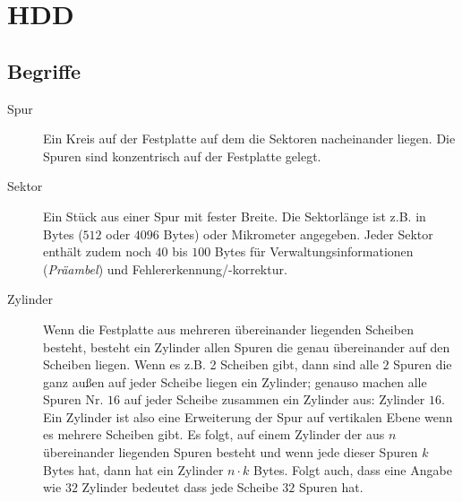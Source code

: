 \section{HDD}

\subsection{Begriffe}
\begin{description}
\item[Spur]
Ein Kreis auf der Festplatte auf dem die Sektoren nacheinander liegen. Die
Spuren sind konzentrisch auf der Festplatte gelegt.

\item[Sektor]
Ein Stück aus einer Spur mit fester Breite. Die Sektorlänge ist z.B. in Bytes
($512$ oder $4096$ Bytes) oder Mikrometer angegeben. Jeder Sektor enthält zudem
noch $40$ bis $100$ Bytes für Verwaltungsinformationen (\emph{Präambel}) und 
Fehlererkennung/-korrektur.

\item[Zylinder]
Wenn die Festplatte aus mehreren übereinander liegenden Scheiben besteht,
besteht ein Zylinder allen Spuren die genau übereinander auf den Scheiben
liegen. Wenn es z.B. 2 Scheiben gibt, dann sind alle $2$ Spuren die ganz außen
auf jeder Scheibe liegen ein Zylinder; genauso machen alle Spuren Nr. $16$ auf
jeder Scheibe zusammen ein Zylinder aus: Zylinder $16$. Ein Zylinder ist also
eine Erweiterung der Spur auf vertikalen Ebene wenn es mehrere Scheiben gibt. Es
folgt, auf einem Zylinder der aus $n$ übereinander liegenden Spuren besteht und
wenn jede dieser Spuren $k$ Bytes hat, dann hat ein Zylinder $n \cdot k$ Bytes.
Folgt auch, dass eine Angabe wie $32$ Zylinder bedeutet dass jede Scheibe $32$
Spuren hat.
\end{description}

